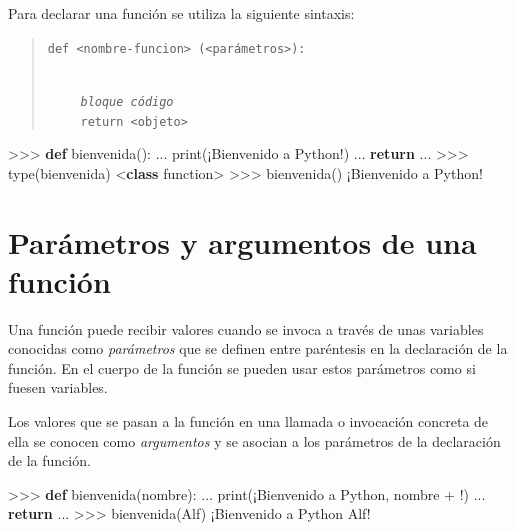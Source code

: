 \documentclass[
  spanish,
  a4paper,
]{scrreport}
\newenvironment{Shaded}{\begin{snugshade}}{\end{snugshade}}
\newcommand{\BuiltInTok}[1]{\textcolor[rgb]{0.00,0.23,0.31}{#1}}
\newcommand{\ControlFlowTok}[1]{\textcolor[rgb]{0.00,0.23,0.31}{\textbf{#1}}}
\newcommand{\KeywordTok}[1]{\textcolor[rgb]{0.00,0.23,0.31}{\textbf{#1}}}
\newcommand{\NormalTok}[1]{\textcolor[rgb]{0.00,0.23,0.31}{#1}}
\newcommand{\OperatorTok}[1]{\textcolor[rgb]{0.37,0.37,0.37}{#1}}
\newcommand{\StringTok}[1]{\textcolor[rgb]{0.13,0.47,0.30}{#1}}
\begin{document}
Para declarar una función se utiliza la siguiente sintaxis:

\begin{quote}
\texttt{def\ \textless{}nombre-funcion\textgreater{}\ (\textless{}parámetros\textgreater{}):}\strut \\
     \emph{\texttt{bloque\ código}}\\
     \texttt{return\ \textless{}objeto\textgreater{}}
\end{quote}

\begin{Shaded}
\begin{Highlighting}[]
\OperatorTok{\textgreater{}\textgreater{}\textgreater{}} \KeywordTok{def}\NormalTok{ bienvenida():}
\NormalTok{...     }\BuiltInTok{print}\NormalTok{(}\StringTok{\textquotesingle{}¡Bienvenido a Python!\textquotesingle{}}\NormalTok{)}
\NormalTok{...     }\ControlFlowTok{return}
\NormalTok{...}
\OperatorTok{\textgreater{}\textgreater{}\textgreater{}} \BuiltInTok{type}\NormalTok{(bienvenida)}
\OperatorTok{\textless{}}\KeywordTok{class} \StringTok{\textquotesingle{}function\textquotesingle{}}\OperatorTok{\textgreater{}}
\OperatorTok{\textgreater{}\textgreater{}\textgreater{}}\NormalTok{ bienvenida()}
\NormalTok{¡Bienvenido a Python}\OperatorTok{!}
\end{Highlighting}
\end{Shaded}

\section{Parámetros y argumentos de una
función}\label{paruxe1metros-y-argumentos-de-una-funciuxf3n}

Una función puede recibir valores cuando se invoca a través de unas
variables conocidas como \emph{parámetros} que se definen entre
paréntesis en la declaración de la función. En el cuerpo de la función
se pueden usar estos parámetros como si fuesen variables.

Los valores que se pasan a la función en una llamada o invocación
concreta de ella se conocen como \emph{argumentos} y se asocian a los
parámetros de la declaración de la función.

\begin{Shaded}
\begin{Highlighting}[]
\OperatorTok{\textgreater{}\textgreater{}\textgreater{}} \KeywordTok{def}\NormalTok{ bienvenida(nombre):}
\NormalTok{...     }\BuiltInTok{print}\NormalTok{(}\StringTok{\textquotesingle{}¡Bienvenido a Python\textquotesingle{}}\NormalTok{, nombre }\OperatorTok{+} \StringTok{\textquotesingle{}!\textquotesingle{}}\NormalTok{)}
\NormalTok{...     }\ControlFlowTok{return}
\NormalTok{...}
\OperatorTok{\textgreater{}\textgreater{}\textgreater{}}\NormalTok{ bienvenida(}\StringTok{\textquotesingle{}Alf\textquotesingle{}}\NormalTok{)}
\NormalTok{¡Bienvenido a Python Alf}\OperatorTok{!}
\end{Highlighting}
\end{Shaded}
\end{document}
